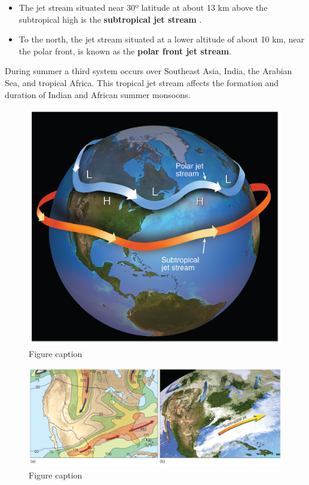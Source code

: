 \documentclass[12pt,oneside]{book}
\providecommand{\tightlist}{%
  \setlength{\itemsep}{0pt}\setlength{\parskip}{0pt}}
\begin{document}
\begin{itemize}
\tightlist
\item
  The jet stream situated near 30º latitude at about 13 km above the
  subtropical high is the \textbf{subtropical jet stream} .
\item
  To the north, the jet stream situated at a lower altitude of about 10
  km, near the polar front, is known as the \textbf{polar front jet
  stream}.
\end{itemize}

During summer a third system occurs over Southeast Asia, India, the
Arabian Sea, and tropical Africa. This tropical jet stream affects the
formation and duration of Indian and African summer monsoons.

\begin{figure}

{\centering \includegraphics[width=0.8\linewidth]{figures/Figure521b} 

}

\caption{Figure caption}\label{fig:Fig521b}
\end{figure}\begin{figure}

{\centering \includegraphics[width=0.8\linewidth]{figures/Figure521c} 

}

\caption{Figure caption}\label{fig:Fig521c}
\end{figure}
\end{document}
